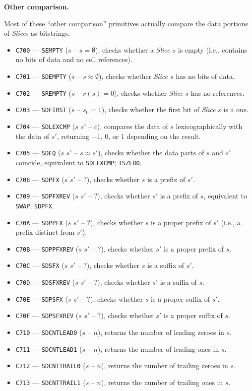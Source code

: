\documentclass[12pt,oneside]{article}
\def\makepoint#1{\medbreak\noindent{\bf #1.\ }}
\def\nxsubpoint{\refstepcounter{subsubsection}%
    \smallbreak\makepoint{\thesubsubsection}}
\def\emb#1{\textbf{#1.}}
\begin{document}
\nxsubpoint\emb{Other comparison}

Most of these ``other comparison'' primitives actually compare the data portions of {\em Slice\/}s as bitstrings.

\begin{itemize}
\item {\tt C700} --- {\tt SEMPTY} ($s$ -- $s=\emptyset$), checks whether a {\em Slice\/ $s$} is empty (i.e., contains no bits of data and no cell references).
\item {\tt C701} --- {\tt SDEMPTY} ($s$ -- $s\approx\emptyset$), checks whether {\em Slice\/ $s$} has no bits of data.
\item {\tt C702} --- {\tt SREMPTY} ($s$ -- $r(s)=0$), checks whether {\em Slice\/} $s$ has no references.
\item {\tt C703} --- {\tt SDFIRST} ($s$ -- $s_0=1$), checks whether the first bit of {\em Slice\/} $s$ is a one.
\item {\tt C704} --- {\tt SDLEXCMP} ($s$ $s'$ -- $c$), compares the data of $s$ lexicographically with the data of $s'$, returning $-1$, 0, or 1 depending on the result.
\item {\tt C705} --- {\tt SDEQ} ($s$ $s'$ -- $s\approx s'$), checks whether the data parts of $s$ and $s'$ coincide, equivalent to {\tt SDLEXCMP}; {\tt ISZERO}.
\item {\tt C708} --- {\tt SDPFX} ($s$ $s'$ -- $?$), checks whether $s$ is a prefix of $s'$.
\item {\tt C709} --- {\tt SDPFXREV} ($s$ $s'$ -- $?$), checks whether $s'$ is a prefix of $s$, equivalent to {\tt SWAP}; {\tt SDPFX}.
\item {\tt C70A} --- {\tt SDPPFX} ($s$ $s'$ -- $?$), checks whether $s$ is a proper prefix of $s'$ (i.e., a prefix distinct from $s'$).
\item {\tt C70B} --- {\tt SDPPFXREV} ($s$ $s'$ -- $?$), checks whether $s'$ is a proper prefix of $s$.
\item {\tt C70C} --- {\tt SDSFX} ($s$ $s'$ -- $?$), checks whether $s$ is a suffix of $s'$.
\item {\tt C70D} --- {\tt SDSFXREV} ($s$ $s'$ -- $?$), checks whether $s'$ is a suffix of $s$.
\item {\tt C70E} --- {\tt SDPSFX} ($s$ $s'$ -- $?$), checks whether $s$ is a proper suffix of $s'$.
\item {\tt C70F} --- {\tt SDPSFXREV} ($s$ $s'$ -- $?$), checks whether $s'$ is a proper suffix of $s$.
\item {\tt C710} --- {\tt SDCNTLEAD0} ($s$ -- $n$), returns the number of leading zeroes in $s$.
\item {\tt C711} --- {\tt SDCNTLEAD1} ($s$ -- $n$), returns the number of leading ones in $s$.
\item {\tt C712} --- {\tt SDCNTTRAIL0} ($s$ -- $n$), returns the number of trailing zeroes in $s$.
\item {\tt C713} --- {\tt SDCNTTRAIL1} ($s$ -- $n$), returns the number of trailing ones in $s$.
\end{itemize}
\end{document}
